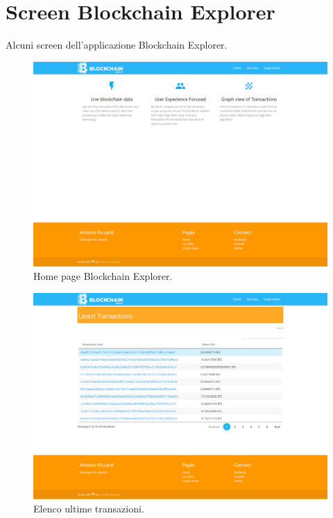 \chapter{Screen Blockchain Explorer}
\label{app:a}
Alcuni screen dell'applicazione Blockchain Explorer.

\begin{figure}[H]
	\centering
	\includegraphics[width=\textwidth, height=0.60\textheight]{images/homePage.png}
	\caption{Home page Blockchain Explorer.}
	\label{fig:homeBE}
\end{figure}

\begin{figure}[H]
	\centering
	\includegraphics[width=\textwidth, height=0.80\textheight]{images/lastTransaction.png}
	\caption{Elenco ultime transazioni.}
	\label{fig:transactionsBE}
\end{figure}


